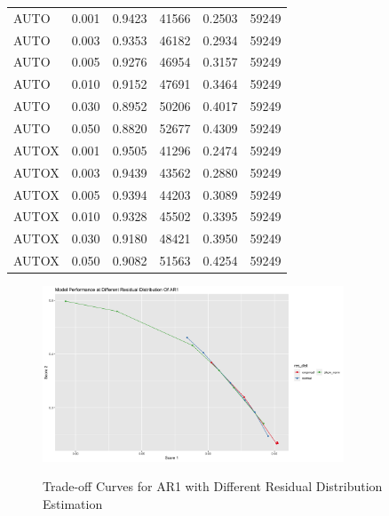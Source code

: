 \documentclass{article}
\begin{document}
\begin{longtable}[htbp]{l|l|*{4}{c}}
    AUTO & 0.001 & 0.9423 & 41566 & 0.2503 & 59249\\
    AUTO & 0.003 & 0.9353 & 46182 & 0.2934 & 59249\\
    AUTO & 0.005 & 0.9276 & 46954 & 0.3157 & 59249\\
    AUTO & 0.010 & 0.9152 & 47691 & 0.3464 & 59249\\
    AUTO & 0.030 & 0.8952 & 50206 & 0.4017 & 59249\\
    AUTO & 0.050 & 0.8820 & 52677 & 0.4309 & 59249\\
    AUTOX & 0.001 & 0.9505 & 41296 & 0.2474 & 59249\\
    AUTOX & 0.003 & 0.9439 & 43562 & 0.2880 & 59249\\
    AUTOX & 0.005 & 0.9394 & 44203 & 0.3089 & 59249\\
    AUTOX & 0.010 & 0.9328 & 45502 & 0.3395 & 59249\\
    AUTOX & 0.030 & 0.9180 & 48421 & 0.3950 & 59249\\
    AUTOX & 0.050 & 0.9082 & 51563 & 0.4254 & 59249\\
\end{longtable}

\begin{figure}[htbp]
    \caption{Trade-off Curves for AR1 with Different Residual Distribution Estimation}
    \centering
    \includegraphics[width = 0.8\textwidth]{images/ModelPerformanceatDifferentResidualDistributionOfAR1.png}
    \label{fig:fig1.3.2}
\end{figure}
\end{document}
